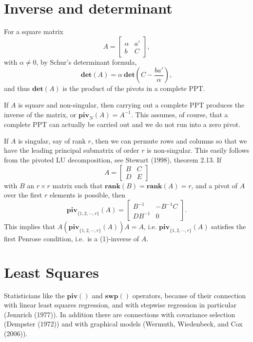 \documentclass[12pt,]{article}
\begin{document}
\section{Inverse and determinant}\label{inverse-and-determinant}

For a square matrix \[
A=\begin{bmatrix}\alpha&a'\\b&C\end{bmatrix},
\] with \(\alpha\not= 0\), by Schur's determinant formula, \[
\mathbf{det}(A)=\alpha\ \mathbf{det}(C-\frac{ba'}{\alpha}),
\] and thus \(\mathbf{det}(A)\) is the product of the pivots in a
complete PPT.

If \(A\) is square and non-singular, then carrying out a complete PPT
produces the inverse of the matrix, or \(\mathbf{piv}_N(A)=A^{-1}\).
This assumes, of course, that a complete PPT can actually be carried out
and we do not run into a zero pivot.

If \(A\) is singular, say of rank \(r\), then we can permute rows and
columns so that we have the leading principal submatrix of order \(r\)
is non-singular. This easily follows from the pivoted LU decomposition,
see Stewart (1998), theorem 2.13. If \[
A=\begin{bmatrix}B&C\\D&E\end{bmatrix}
\] with \(B\) an \(r\times r\) matrix such that
\(\mathbf{rank}(B)=\mathbf{rank}(A)=r\), and a pivot of \(A\) over the
first \(r\) elements is possible, then \[
\mathbf{piv}_{\{1,2,\cdots,r\}}(A)=\begin{bmatrix}B^{-1}&-B^{-1}C\\DB^{-1}&0\end{bmatrix}.
\] This implies that
\(A\left(\mathbf{piv}_{\{1,2,\cdots,r\}}(A)\right)A=A\), i.e.
\(\mathbf{piv}_{\{1,2,\cdots,r\}}(A)\) satisfies the first Penrose
condition, i.e.~is a (1)-inverse of \(A\).

\section{Least Squares}\label{least-squares}

Statisticians like the \(\mathbf{piv}()\) and \(\mathbf{swp}()\)
operators, because of their connection with linear least squares
regression, and with stepwise regression in particular (Jennrich
(1977)). In addition there are connections with covariance selection
(Dempster (1972)) and with graphical models (Wermuth, Wiedenbeck, and
Cox (2006)).
\end{document}

